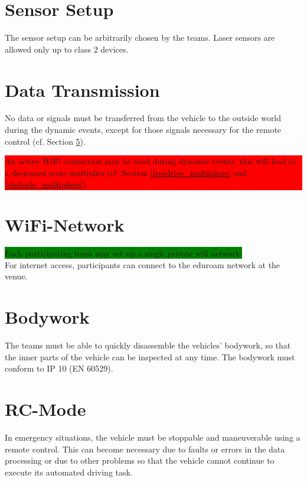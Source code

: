 \section{Sensor Setup}

The sensor setup can be arbitrarily chosen by the teams. Laser sensors are
allowed only up to class 2 devices.

\section{Data Transmission}

No data or signals must be transferred from the vehicle to the outside world
during the dynamic events, except for those signals necessary for the remote
control (cf. Section \ref{rc_mode}).\\
\colorbox{red}{\parbox{\colorboxwidth}{An active WiFi connection may be used
		during dynamic events, this will lead to a decreased score multiplier.(cf.
		Section \ref{freedrive_multipliers} and \ref{obstacle_multipliers})}}

\section{WiFi-Network}

\colorbox{green}{Each participating team may set up a single private wifi network.}\\
For internet access, participants can connect to the eduroam network at the venue.\\

\section{Bodywork}

The teams must be able to quickly disassemble the vehicles’ bodywork, so that
the inner parts of the vehicle can be inspected at any time. The bodywork must
conform to IP 10 (EN 60529).

\section{RC-Mode}
\label{rc_mode}

In emergency situations, the vehicle must be stoppable and maneuverable using a
remote control. This can become necessary due to faults or errors in the data
processing or due to other problems so that the vehicle cannot continue to
execute its automated driving task.

